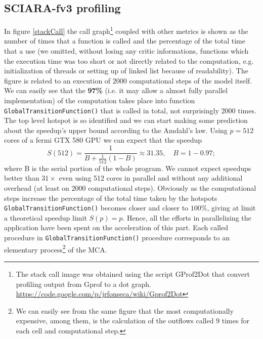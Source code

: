 \subsection{SCIARA-fv3 profiling}
In figure \ref{stackCall} the call graph\footnote{The stack call image was
obtained using the script GProf2Dot that convert profiling output from Gprof to
a dot graph. \url{https://code.google.com/p/jrfonseca/wiki/Gprof2Dot}} coupled
with other metrics is shown as the number of times that a function is called
and the percentage of the total time that a use (we omitted, without losing any critic
informations, functions which the execution time was too short or not directly
related to the computation, e.g. initialization of threads or setting up of
linked list because of readability).
The figure is related to an execution of \(2000\) computational steps of the
model itself.
We can easily see that the \textbf{97\%} (i.e. it may allow a almost fully
parallel implementation) of the computation takes place into function
\texttt{GlobalTransitionFunction()} that is called in total, not surprisingly
2000 times. The top level hotspot is so identified and we can start making some
prediction about the speedup's upper bound according to the Amdahl's law.
Using \(p=512\) cores of a fermi GTX 580 GPU we can expect that the speedup \[
S(512)=\frac{1}{B+\frac{1}{512}(1-B)}\approx31.35, \quad B=1-0.97; \] where B is
the serial portion of the whole program. We cannot expect speedups better than
\(31\times\) even using 512 cores in parallel and without any additional
overhead (at least on 2000 computational steps).
Obviously as the computational steps increase the percentage of the total time
taken by the hotspots \texttt{GlobalTransitionFunction()} becomes closer and
closer to \(100\%\), giving at limit a theoretical speedup limit \(S(p)=p\).
Hence, all the efforts in parallelizing the application have been spent on the
acceleration of this part. Each called procedure in
\texttt{GlobalTransitionFunction()} procedure corresponds to an elementary
process\footnote{We can easily see from the same figure that the most
computationally expensive, among them, is the calculation of the outflows
called 9 times for each cell and computational step.} of the MCA.
